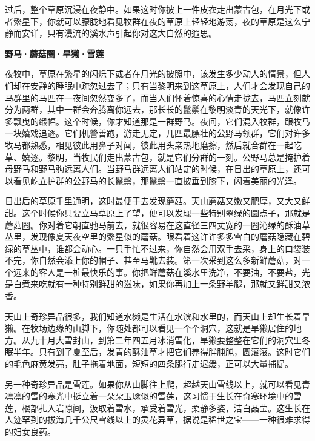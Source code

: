 \documentclass[12pt,UTF-8,openany]{ctexbook}
\begin{document}
\begin{large}
    过后，整个草原沉浸在夜静中。如果这时你披上一件皮衣走出蒙古包，在月光下或者繁星下，你就可以朦胧地看见牧群在夜的草原上轻轻地游荡，夜的草原是这么宁静而安详，只有漫流的溪水声引起你对这大自然的遐思。
    
    \begin{center}
    
    \begin{large}\textbf{野马·蘑菇圈·旱獭·雪莲}\end{large}
    
    \end{center}
    
    夜牧中，草原在繁星的闪烁下或者在月光的披照中，该发生多少动人的情景，但人们却在安静的睡眠中疏忽过去了；只有当黎明来到这草原上，人们才会发现自己的马群里的马匹在一夜间忽然变多了，而当人们怀着惊喜的心情走拢去，马匹立刻就分为两群，其中一群会奔腾离你远去，那长长的鬣鬃在黎明淡青的天光下，就像许多飘曳的缎幅。这个时候，你才知道那是一群野马。夜间，它们混入牧群，跟牧马一块嬉戏追逐。它们机警善跑，游走无定，几匹最膘壮的公野马领群，它们对许多牧马都熟悉，相见彼此用鼻子对闻，彼此用头亲热地磨擦，然后就合群在一起吃草、嬉逐。黎明，当牧民们走出蒙古包，就是它们分群的一刻。公野马总是掩护着母野马和野马驹远离人们。当野马群远离人们站定的时候，在日出的草原上，还可以看见屹立护群的公野马的长鬣鬃，那鬣鬃一直披垂到膝下，闪着美丽的光泽。
    
    日出后的草原千里通明，这时最便于去发现蘑菇。天山蘑菇又嫩又肥厚，又大又鲜甜。这个时候你只要立马草原上了望，便可以发现一些特别翠绿的圆点子，那就是蘑菇圈。你对着它朝直驰马前去，就很容易在这直径三四丈宽的一圈沁绿的酥油草丛里，发现像夏天夜空里的繁星似的蘑菇。眼看着这许许多多雪白的蘑菇隐藏在碧绿的草丛中，谁都会动心。一只手忙不过来，你自然会用双手去采，身上的口袋装不完，你自然会添上你的帽子、甚至马靴去装。第一次采到这么多新鲜蘑菇，对一个远来的客人是一桩最快乐的事。你把鲜蘑菇在溪水里洗净，不要油，不要盐，光是白煮来吃就有一种特别鲜甜的滋味，如果你再加上一条野羊腿，那就又鲜甜又浓香。
    
    天山上奇珍异品很多，我们知道水獭是生活在水滨和水里的，而天山上却生长着旱獭。在牧场边缘的山脚下，你随处都可以看见一个个洞穴，这就是旱獭居住的地方。从九十月大雪封山，到第二年四五月冰消雪化，旱獭要整整在它们的洞穴里冬眠半年。只有到了夏至后，发青的酥油草才把它们养得胖肫肫，圆滚滚。这时它们的毛色麻黄发亮，肚子拖着地面，短短的四条腿行走迟缓，正可以大量捕捉。
    
    另一种奇珍异品是雪莲。如果你从山脚往上爬，超越天山雪线以上，就可以看见青凛凛的雪的寒光中挺立着一朵朵玉琢似的雪莲，这习惯于生长在奇寒环境中的雪莲，根部扎入岩隙间，汲取着雪水，承受着雪光，柔静多姿，洁白晶莹。这生长在人迹罕到的拔海几千公尺雪线以上的灵花异草，据说是稀世之宝——一种很难求得的妇女良药。
    

\end{large}
\end{document}
